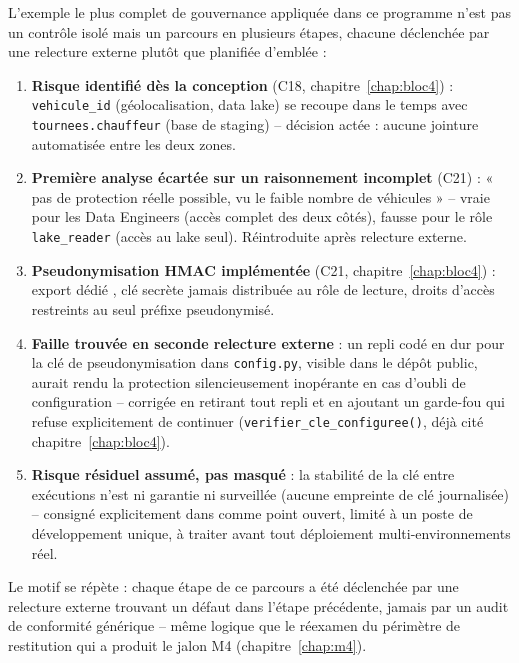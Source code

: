 L'exemple le plus complet de gouvernance appliquée dans ce programme
n'est pas un contrôle isolé mais un parcours en plusieurs étapes,
chacune déclenchée par une relecture externe plutôt que planifiée
d'emblée :

\begin{enumerate}
  \item \textbf{Risque identifié dès la conception} (C18,
    chapitre~\ref{chap:bloc4}) : \texttt{vehicule\_id} (géolocalisation,
    data lake) se recoupe dans le temps avec \texttt{tournees.chauffeur}
    (base de staging) -- décision actée : aucune jointure automatisée
    entre les deux zones.
  \item \textbf{Première analyse écartée sur un raisonnement
    incomplet} (C21) : « pas de protection réelle possible, vu le
    faible nombre de véhicules » -- vraie pour les Data Engineers
    (accès complet des deux côtés), fausse pour le rôle
    \texttt{lake\_reader} (accès au lake seul). Réintroduite après
    relecture externe.
  \item \textbf{Pseudonymisation HMAC implémentée} (C21,
    chapitre~\ref{chap:bloc4}) : export dédié ,
    clé secrète jamais distribuée au rôle de lecture, droits d'accès
    restreints au seul préfixe pseudonymisé.
  \item \textbf{Faille trouvée en seconde relecture externe} : un
    repli codé en dur pour la clé de pseudonymisation dans
    \texttt{config.py}, visible dans le dépôt public, aurait rendu la
    protection silencieusement inopérante en cas d'oubli de
    configuration -- corrigée en retirant tout repli et en ajoutant
    un garde-fou qui refuse explicitement de continuer
    (\texttt{verifier\_cle\_configuree()}, déjà cité
    chapitre~\ref{chap:bloc4}).
  \item \textbf{Risque résiduel assumé, pas masqué} : la stabilité de
    la clé entre exécutions n'est ni garantie ni surveillée (aucune
    empreinte de clé journalisée) -- consigné explicitement dans
     comme point ouvert, limité à
    un poste de développement unique, à traiter avant tout déploiement
    multi-environnements réel.
\end{enumerate}

Le motif se répète : chaque étape de ce parcours a été déclenchée par
une relecture externe trouvant un défaut dans l'étape précédente,
jamais par un audit de conformité générique -- même logique que le
réexamen du périmètre de restitution qui a produit le jalon M4
(chapitre~\ref{chap:m4}).

